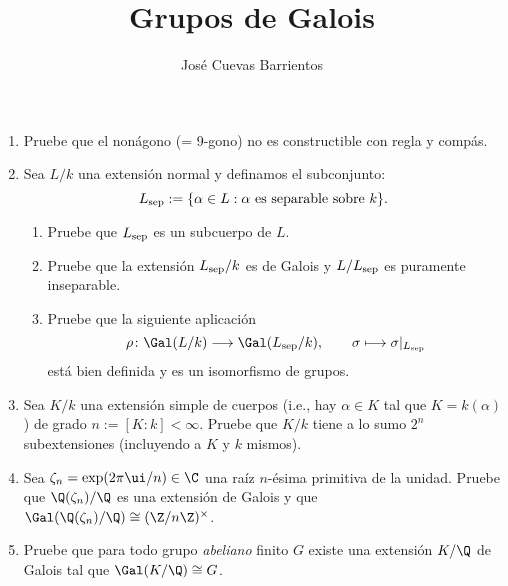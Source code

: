 \documentclass[11pt, reqno]{amsart}
\title{Grupos de Galois}
\date{\DTMdate{2025-04-03}}
\author{José Cuevas Barrientos}
\begin{document}
\maketitle

\begin{enumerate}
	\item Pruebe que el nonágono (= 9-gono) no es constructible con regla y compás.
	\item Sea $L/k$ una extensión normal y definamos el subconjunto:
		\[
			L_{\rm sep} := \{ \alpha \in L : \alpha \text{ es separable sobre } k \}.
		\]
		\begin{enumerate}
			\item Pruebe que $L_{\rm sep}$ es un subcuerpo de $L$.
			\item Pruebe que la extensión $L_{\rm sep}/k$ es de Galois y $L/L_{\rm sep}$ es puramente inseparable.
			\item Pruebe que la siguiente aplicación
				\[
					\rho \colon \Gal(L/k) \longrightarrow \Gal(L_{\rm sep}/k), \qquad \sigma \longmapsto \sigma|_{L_{\rm sep}}
				\]
				está bien definida y es un isomorfismo de grupos.
		\end{enumerate}
	\item Sea $K/k$ una extensión simple de cuerpos (i.e., hay $\alpha \in K$ tal que $K = k(\alpha)$) de grado $n
		:= [K:k] < \infty$.
		Pruebe que $K/k$ tiene a lo sumo $2^n$ subextensiones (incluyendo a $K$ y $k$ mismos).
	\item\lookright
		Sea $\zeta_n = \exp(2\pi\ui / n) \in \C$ una raíz $n$-ésima primitiva de la unidad.
		Pruebe que $\Q(\zeta_n)/\Q$ es una extensión de Galois y que $\Gal(\Q(\zeta_n)/\Q) \cong
		(\Z/n\Z)^\times$.
	\item\lookst Pruebe que para todo grupo \emph{abeliano} finito $G$ existe una extensión $K/\Q$ de Galois tal que
		$\Gal(K/\Q) \cong G$.


\end{enumerate}
\end{document}
